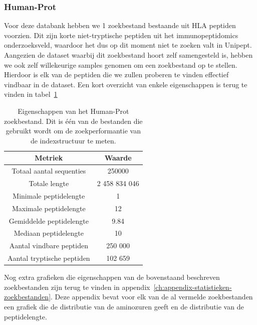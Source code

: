 \documentclass[11pt,dutch,faculty=we,layout=titlefont,underline=false,titleUppercase=true,titleUnderline=true]{ugent2016-report}
\begin{document}
    \subsubsection{Human-Prot}
    Voor deze databank hebben we 1 zoekbestand bestaande uit HLA peptiden voorzien.
    Dit zijn korte niet-tryptische peptiden uit het immunopeptidomics onderzoeksveld, waardoor het dus op dit moment niet te zoeken valt in Unipept.
    Aangezien de dataset waarbij dit zoekbestand hoort zelf samengesteld is, hebben we ook zelf willekeurige samples genomen om een zoekbestand op te stellen.
    Hierdoor is elk van de peptiden die we zullen proberen te vinden effectief vindbaar in de dataset.
    Een kort overzicht van enkele eigenschappen is terug te vinden in tabel~\ref{tab:humanprot_zoekbestand}

    \begin{table}[h!]
        \centering
        \begin{tabular}{ c c }
            Metriek                    & Waarde        \\
            \hline\hline
            Totaal aantal sequenties   & 250000        \\
            Totale lengte              & 2 458 834 046 \\
            Minimale peptidelengte     & 1             \\
            Maximale peptidelengte     & 12            \\
            Gemiddelde peptidelengte   & 9.84          \\
            Mediaan peptidelengte      & 10            \\
            Aantal vindbare peptiden   & 250 000       \\
            Aantal tryptische peptiden & 102 659       \\
            \hline
        \end{tabular}
        \caption{Eigenschappen van het Human-Prot zoekbestand. Dit is één van de bestanden die gebruikt wordt om de zoekperformantie van de indexstructuur te meten.}
        \label{tab:humanprot_zoekbestand}
    \end{table}


    Nog extra grafieken die eigenschappen van de bovenstaand beschreven zoekbestanden zijn terug te vinden in appendix~\ref{ch:appendix-statistieken-zoekbestanden}.
    Deze appendix bevat voor elk van de al vermelde zoekbestanden een grafiek die de distributie van de aminozuren geeft en de distributie van de peptidelengte.
\end{document}
